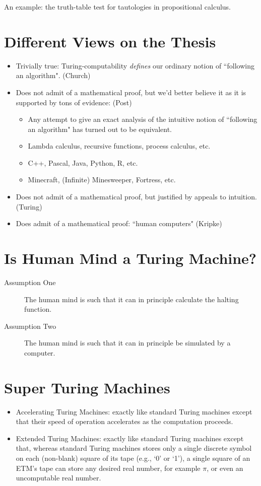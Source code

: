 \documentclass[12pt]{article}
\theoremstyle{definition}
\begin{document}
An example: the truth-table test for tautologies in propositional calculus.

\section{Different Views on the Thesis}

\begin{itemize}
\item Trivially true: Turing-computability \textit{defines} our ordinary notion of ``following an algorithm". (Church) 
\item Does not admit of a mathematical proof, but we'd better believe it as it is supported by tons of evidence: (Post)
\begin{itemize}
\item Any attempt to give an exact analysis of the intuitive notion of ``following an algorithm" has turned out to be equivalent.
\item Lambda calculus, recursive functions, process calculus, etc.
\item C++, Pascal, Java, Python, R, etc.
\item Minecraft, (Infinite) Minesweeper, Fortress, etc.
\end{itemize}
\item Does not admit of a mathematical proof, but justified by appeals to intuition. (Turing)
\item Does admit of a mathematical proof: ``human computers" (Kripke)
\end{itemize}

\section{Is Human Mind a Turing Machine?}

\begin{description}
\item[Assumption One] The human mind is such that it can in principle calculate the halting function. 
\item[Assumption Two] The human mind is such that it can in principle be simulated by a computer.
\end{description}

\section{Super Turing Machines}

\begin{itemize}
\item Accelerating Turing Machines: exactly like standard Turing machines except that their speed of operation accelerates as the computation proceeds.
\item Extended Turing Machines: exactly like standard Turing machines except that, whereas standard Turing machines stores only a single discrete symbol on each (non-blank) square of its tape (e.g., `0’ or `1’), a single square of an ETM’s tape can store any desired real number, for example $\pi$, or even an uncomputable real number.
\end{itemize}
\end{document}
